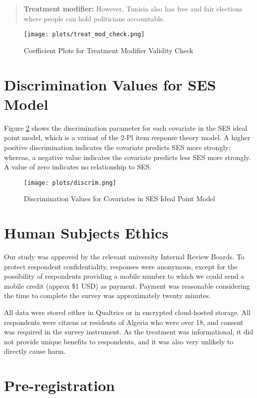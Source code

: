 \documentclass[12pt, letterpaper]{article}
\begin{document}
\begin{quotation}
\textbf{Treatment modifier:} However, Tunisia also has free and fair elections where people can hold politicians accountable.
\end{quotation}

\begin{figure}[H]
    \centering
    \texttt{[image: plots/treat\_mod\_check.png]}
    \caption{Coefficient Plots for Treatment Modifier Validity Check}
    \label{valid}
\end{figure}

\section{Discrimination Values for SES Model}

Figure \ref{2pl} shows the discrimination parameter for each covariate in the SES ideal point model, which is a variant of the 2-Pl item response theory model. A higher positive discrimination indicates the covariate predicts SES more strongly; whereas, a negative value indicates the covariate predicts less SES more strongly. A value of zero indicates no relationship to SES.

\begin{figure}[H]
    \centering
    \texttt{[image: plots/discrim.png]}
    \caption{Discrimination Values for Covariates in SES Ideal Point Model}
    \label{2pl}
\end{figure}

\section{Human Subjects Ethics}
 Our study was approved by the relevant university Internal Review Boards. To protect respondent confidentiality, responses were anonymous, except for the possibility of respondents providing a mobile number to which we could send a mobile credit (approx \$1 USD) as payment. Payment was reasonable considering the time to complete the survey was approximately twenty minutes. 

 All data were stored either in Qualtrics or in encrypted cloud-hosted storage. All respondents were citzens or residents of Algeria who were over 18, and consent was required in the survey instrument. As the treatment was informational, it did not provide unique benefits to respondents, and it was also very unlikely to directly cause harm. 

\section{Pre-registration}
\end{document}
